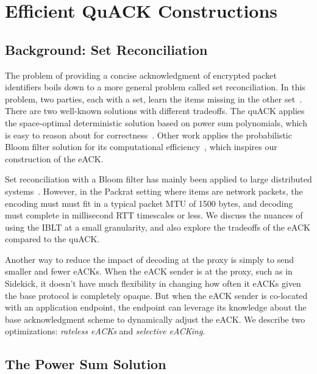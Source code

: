 \section{Efficient QuACK Constructions}



\subsection{Background: Set Reconciliation}

The problem of providing a concise acknowledgment of encrypted packet identifiers
boils down to a more general problem called set reconciliation. In this problem,
two parties, each with a set, learn the items missing in the other
set~\cite{minsky2003set,eppstein2011straggler}.
There are two well-known solutions with different tradeoffs. The quACK
applies the space-optimal deterministic solution based on
power sum polynomials, which is easy to reason about for correctness~\cite{yuan2024sidekick}.
Other work applies the probabilistic Bloom filter solution
for its computational efficiency~\cite{yang2024practical,summermatter2021byzantine},
which inspires our construction of the eACK.

Set reconciliation with a Bloom filter has mainly been applied to large distributed systems~\cite
{yang2024practical,summermatter2021byzantine}. However, in the Packrat setting
where items are network packets, the encoding must must fit in a typical packet
MTU of 1500 bytes, and decoding must complete in millisecond RTT timescales or
less. We discuss the nuances of using the IBLT at a small granularity, and
also explore the tradeoffs of the eACK compared to the quACK.

Another way to reduce the impact of decoding at the proxy is simply to send smaller
and fewer eACKs. When the eACK sender is at the proxy, such as in Sidekick,
it doesn't have much flexibility in changing how often it eACKs given
the base protocol is completely opaque. But when the eACK sender is co-located
with an application endpoint, the endpoint can leverage its knowledge about the
base acknowledgment scheme to dynamically adjust the eACK.
We describe two optimizations: \textit{rateless eACKs} and \textit{selective eACKing}.

\subsection{The Power Sum Solution}

